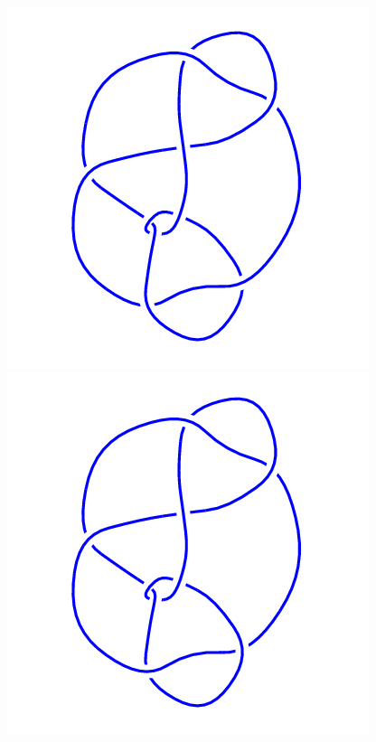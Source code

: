 \begin{figure}[H]
\begin{minipage}[b]{.18\linewidth}
    \end{minipage}
    \begin{minipage}[b]{.18\linewidth}
        \centering
        \includegraphics[width=\linewidth]{../data/9_43.png}
    \end{minipage}
    \begin{minipage}[b]{.18\linewidth}
        \centering
        \includegraphics[width=\linewidth]{../data/9_44.png}

\end{minipage}
\end{figure}
